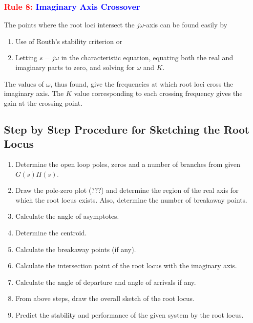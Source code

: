 \documentclass[
  14pt,
  a4paper,
  oneside,
  open=any,
  a4paper,
  14pt]{report}
\begin{document}
\subsubsection*{\texorpdfstring{\textcolor{red}{Rule 8:}
\textcolor{blue}{Imaginary Axis
Crossover}}{Rule 8: Imaginary Axis Crossover}}\label{rule-8-imaginary-axis-crossover}

The points where the root loci intersect the \(j\omega\)-axis can be
found easily by

\begin{enumerate}
\def\labelenumi{\alph{enumi}.}
\item
  Use of Routh's stability criterion or
\item
  Letting \(s=j\omega\) in the characteristic equation, equating both
  the real and imaginary parts to zero, and solving for \(\omega\) and
  \(K\).
\end{enumerate}

The values of \(\omega\), thus found, give the frequencies at which root
loci cross the imaginary axis. The \(K\) value corresponding to each
crossing frequency gives the gain at the crossing point.

\subsection{Step by Step Procedure for Sketching the Root
Locus}\label{step-by-step-procedure-for-sketching-the-root-locus}

\begin{enumerate}
\def\labelenumi{\arabic{enumi}.}
\item
  Determine the open loop poles, zeros and a number of branches from
  given \(G(s)H(s)\).
\item
  Draw the pole-zero plot (???) and determine the region of the real
  axis for which the root locus exists. Also, determine the number of
  breakaway points.
\item
  Calculate the angle of asymptotes.
\item
  Determine the centroid.
\item
  Calculate the breakaway points (if any).
\item
  Calculate the intersection point of the root locus with the imaginary
  axis.
\item
  Calculate the angle of departure and angle of arrivals if any.
\item
  From above steps, draw the overall sketch of the root locus.
\item
  Predict the stability and performance of the given system by the root
  locus.
\end{enumerate}
\end{document}
